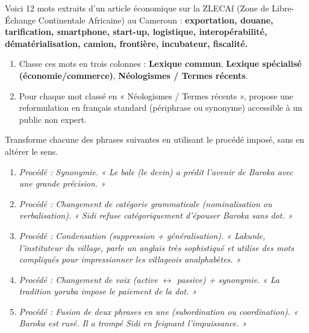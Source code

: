 \documentclass[11pt]{article}
\begin{document}
\begin{exercice}
Voici 12 mots extraits d'un article économique sur la ZLECAf (Zone de Libre-Échange Continentale Africaine) au Cameroun :
\textbf{exportation, douane, tarification, smartphone, start-up, logistique, interopérabilité, dématérialisation, camion, frontière, incubateur, fiscalité.}
\begin{enumerate}
    \item Classe ces mots en trois colonnes : \textbf{Lexique commun}, \textbf{Lexique spécialisé (économie/commerce)}, \textbf{Néologismes / Termes récents}.
    \item Pour chaque mot classé en « Néologismes / Termes récents », propose une reformulation en français standard (périphrase ou synonyme) accessible à un public non expert.
\end{enumerate}
\end{exercice}

\begin{exercice}
Transforme chacune des phrases suivantes en utilisant le procédé imposé, sans en altérer le sens.
\begin{enumerate}
    \item \textit{Procédé : Synonymie.} \emph{« Le bale (le devin) a prédit l'avenir de Baroka avec une grande précision. »}
    \item \textit{Procédé : Changement de catégorie grammaticale (nominalisation ou verbalisation).} \emph{« Sidi refuse catégoriquement d'épouser Baroka sans dot. »}
    \item \textit{Procédé : Condensation (suppression + généralisation).} \emph{« Lakunle, l'instituteur du village, parle un anglais très sophistiqué et utilise des mots compliqués pour impressionner les villageois analphabètes. »}
    \item \textit{Procédé : Changement de voix (active $\leftrightarrow$ passive) + synonymie.} \emph{« La tradition yoruba impose le paiement de la dot. »}
    \item \textit{Procédé : Fusion de deux phrases en une (subordination ou coordination).} \emph{« Baroka est rusé. Il a trompé Sidi en feignant l'impuissance. »}
\end{enumerate}
\end{exercice}
\end{document}
